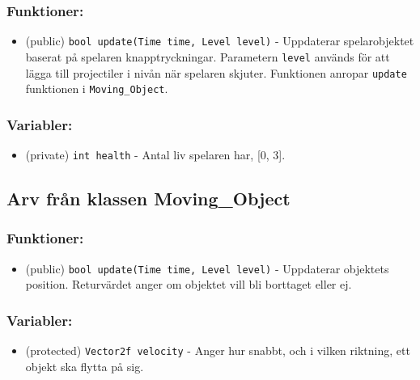 \documentclass{TDP005mall}
\begin{document}
\subsubsection{Funktioner:}
\begin{itemize}
  \item (public) \verb|bool update(Time time, Level level)| - Uppdaterar spelarobjektet baserat på spelaren knapptryckningar. Parametern \verb|level| används för att lägga till projectiler i nivån när spelaren skjuter. Funktionen anropar \verb|update| funktionen i \verb|Moving_Object|.
\end{itemize}

\subsubsection{Variabler:}
\begin{itemize}
  \item (private) \verb|int health| - Antal liv spelaren har, [0, 3].
\end{itemize}

\subsection{Arv från klassen Moving\_Object}
\subsubsection{Funktioner:}
\begin{itemize}
  \item (public) \verb|bool update(Time time, Level level)| - Uppdaterar objektets position. Returvärdet anger om objektet vill bli borttaget eller ej. 
\end{itemize}

\subsubsection{Variabler:}
\begin{itemize}
  \item (protected) \verb|Vector2f velocity| - Anger hur snabbt, och i vilken riktning, ett objekt ska flytta på sig. 
\end{itemize}
\end{document}
